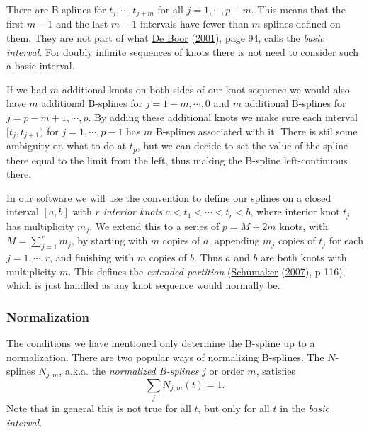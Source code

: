 \documentclass[
  12pt,
]{book}
\theoremstyle{definition}
\theoremstyle{definition}
\theoremstyle{definition}
\theoremstyle{definition}
\theoremstyle{remark}
\begin{document}
There are B-splines for \(t_j,\cdots,t_{j+m}\) for all \(j=1,\cdots,p-m\). This means that the first \(m-1\) and the last
\(m-1\) intervals have fewer than \(m\) splines defined on them. They are not part of what \protect\hyperlink{ref-deboor_01}{De Boor} (\protect\hyperlink{ref-deboor_01}{2001}), page 94, calls the \emph{basic interval}. For doubly infinite sequences of knots there is not need to consider such a basic interval.

If we had \(m\) additional knots on both sides of our knot sequence we would also have \(m\) additional B-splines for \(j=1-m,\cdots,0\) and \(m\) additional B-splines for \(j=p-m+1,\cdots,p\). By adding these additional knots we make sure each interval \([t_j,t_{j+1})\) for \(j=1,\cdots,p-1\) has \(m\) B-splines associated with it. There is stil some ambiguity on what to do at \(t_p\), but we can decide to set the value of the spline there equal to the limit from the left, thus making the B-spline left-continuous there.

In our software we will use the convention to define our splines on a closed interval \([a,b]\) with \(r\) \emph{interior knots}
\(a<t_1<\cdots<t_r<b\), where interior knot \(t_j\) has multiplicity \(m_j\). We extend this to a series of \(p=M+2m\) knots, with \(M=\sum_{j=1}^r m_j\), by starting with \(m\) copies of \(a\), appending \(m_j\) copies of \(t_j\) for each \(j=1,\cdots,r\), and finishing with \(m\) copies of \(b\). Thus \(a\) and \(b\) are both knots with multiplicity \(m\). This defines the \emph{extended partition} (\protect\hyperlink{ref-schumaker_07}{Schumaker} (\protect\hyperlink{ref-schumaker_07}{2007}), p 116), which is just handled as any knot sequence would normally be.

\hypertarget{mathbnormalize}{%
\subsubsection{Normalization}\label{mathbnormalize}}

The conditions we have mentioned only determine the B-spline up to a normalization. There are two popular ways of normalizing B-splines. The \(N\)-splines \(N_{j,m}\), a.k.a. the \emph{normalized B-splines} \(j\) or order \(m\), satisfies
\begin{equation}\label{E:nsum}
\sum_{j}N_{j,m}(t)=1.
\end{equation}
Note that in general this is not true for all \(t\), but only for all \(t\) in the \emph{basic interval}.
\end{document}
